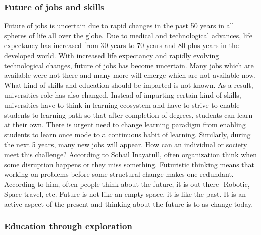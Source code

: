 \documentclass[]{elsarticle} %
\begin{document}
\hypertarget{future-of-jobs-and-skills}{%
\subsubsection{Future of jobs and
skills}\label{future-of-jobs-and-skills}}

Future of jobs is uncertain due to rapid changes in the past 50 years in
all spheres of life all over the globe. Due to medical and technological
advances, life expectancy has increased from 30 years to 70 years and 80
plus years in the developed world. With increased life expectancy and
rapidly evolving technological changes, future of jobs has become
uncertain. Many jobs which are available were not there and many more
will emerge which are not available now. What kind of skills and
education should be imparted is not known. As a result, universities
role has also changed. Instead of imparting certain kind of skills,
universities have to think in learning ecosystem and have to strive to
enable students to learning path so that after completion of degrees,
students can learn at their own. There is urgent need to change learning
paradigm from enabling students to learn once mode to a continuous habit
of learning. Similarly, during the next 5 years, many new jobs will
appear. How can an individual or society meet this challenge? According
to Sohail Inayatull, often organization think when some disruption
happens or they miss something. Futuristic thinking means that working
on problems before some structural change makes one redundant. According
to him, often people think about the future, it is out there- Robotic,
Space travel, etc. Future is not like an empty space, it is like the
past. It is an active aspect of the present and thinking about the
future is to as change today.

\hypertarget{education-through-exploration}{%
\subsubsection{Education through
exploration}\label{education-through-exploration}}
\end{document}
